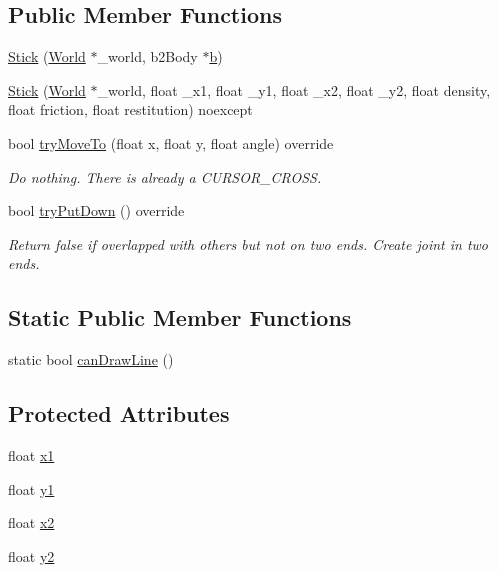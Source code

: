 \subsection*{Public Member Functions}
\begin{DoxyCompactItemize}
\item 
\hyperlink{classStick_a1c2a811e6afc5809f0fcb5fbb401ec16}{Stick} (\hyperlink{classWorld}{World} $\ast$\+\_\+world, b2\+Body $\ast$\hyperlink{image_8h_ab2d05693952610f937e5acb3c4a8fa1b}{b})
\item 
\hyperlink{classStick_ad34dcd633c860e086b9c65201ecdc89c}{Stick} (\hyperlink{classWorld}{World} $\ast$\+\_\+world, float \+\_\+x1, float \+\_\+y1, float \+\_\+x2, float \+\_\+y2, float density, float friction, float restitution) noexcept
\item 
bool \hyperlink{classStick_ad4976e8f57eaf797ab6f4c997795f493}{try\+Move\+To} (float x, float y, float angle) override
\begin{DoxyCompactList}\small\item\em Do nothing. There is already a C\+U\+R\+S\+O\+R\+\_\+\+C\+R\+O\+S\+S. \end{DoxyCompactList}\item 
bool \hyperlink{classStick_a279b6f02d394d224382007a23edd69a2}{try\+Put\+Down} () override
\begin{DoxyCompactList}\small\item\em Return false if overlapped with others but not on two ends. Create joint in two ends. \end{DoxyCompactList}\end{DoxyCompactItemize}
\subsection*{Static Public Member Functions}
\begin{DoxyCompactItemize}
\item 
static bool \hyperlink{classStick_ad2b8a92274aed6d25d79c8b4033b2bfb}{can\+Draw\+Line} ()
\end{DoxyCompactItemize}
\subsection*{Protected Attributes}
\begin{DoxyCompactItemize}
\item 
float \hyperlink{classStick_a64598c448a15601cca5da6f1746db6bd}{x1}
\item 
float \hyperlink{classStick_aa90dd67e8ce5ea1ea2106ad46c05b012}{y1}
\item 
float \hyperlink{classStick_aa0c2a77310a9cbb517cfe62545bb77f4}{x2}
\item 
float \hyperlink{classStick_a1cae5d5fbddeb3ef7a653376da1dd2c6}{y2}
\end{DoxyCompactItemize}

